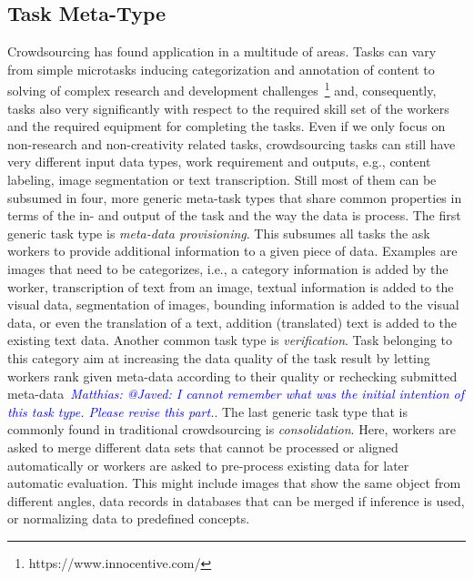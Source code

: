 \documentclass[10pt,twocolumn,letterpaper]{article}
\newcommand{\matthias}[1]{\emph{\textcolor{blue}{Matthias: #1}}}
\begin{document}
\subsection{Task Meta-Type}
Crowdsourcing has found application in a multitude of areas.
Tasks can vary from simple microtasks inducing categorization and annotation of content to solving of complex research and development challenges~\footnote{https://www.innocentive.com/} and, consequently, tasks also very significantly with respect to the required skill set of the workers and the required equipment for completing the tasks.
Even if we only focus on non-research and non-creativity related tasks, crowdsourcing tasks can still have very different input data types, work requirement and outputs, e.g., content labeling, image segmentation or text transcription.
Still most of them can be subsumed in four, more generic meta-task types that share common properties in terms of the in- and output of the task and the way the data is process.
The first generic task type is \emph{meta-data provisioning}.
This subsumes all tasks the ask workers to provide additional information to a given piece of data.
Examples are images that need to be categorizes, i.e., a category information is added by the worker, transcription of text from an image, textual information is added to the visual data, segmentation of images, bounding information is added to the visual data, or even the translation of a text, addition (translated) text is added to the existing text data.
Another common task type is \emph{verification}. 
Task belonging to this category aim at increasing the data quality of the task result by letting workers rank given meta-data according to their quality or rechecking submitted meta-data~\matthias{@Javed: I cannot remember what was the initial intention of this task type. Please revise this part.}.
The last generic task type that is commonly found in traditional crowdsourcing is \emph{consolidation}.
Here, workers are asked to merge different data sets that cannot be processed or aligned automatically or workers are asked to pre-process existing data for later automatic evaluation.
This might include images that show the same object from different angles, data records in databases that can be merged if inference is used, or normalizing data to predefined concepts.
\end{document}
